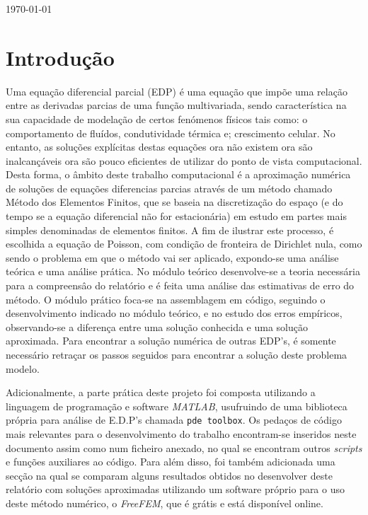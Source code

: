 \documentclass{article}
\theoremstyle{definition}
\theoremstyle{plain}
\numberwithin{equation}{section}
\newcommand{\tab}{\hspace{10mm}}
\begin{document}
\begin{titlepage}
{%
\vspace{1.5cm}
{\large \today}\\[1.5cm]}
\end{titlepage}
\newpage


\renewcommand{\thesection}{\arabic{section}}
\setcounter{secnumdepth}{3}
{
\tableofcontents
}
\pagebreak
\section{Introdução}

\tab Uma equação diferencial parcial (EDP) é uma equação que impõe uma relação entre as derivadas parcias de uma função multivariada, sendo característica na sua capacidade de modelação de certos fenómenos físicos tais como: o comportamento de fluídos, condutividade térmica e; crescimento celular. No entanto, as soluções explícitas destas equações ora não existem ora são inalcançáveis ora são pouco eficientes de utilizar do ponto de vista computacional. Desta forma, o âmbito deste trabalho computacional é a aproximação numérica de soluções de equações diferencias parcias através de um método chamado Método dos Elementos Finitos, que se baseia na discretização do espaço (e do tempo se a equação diferencial não for estacionária) em estudo em partes mais simples denominadas de elementos finitos. A fim de ilustrar este processo, é escolhida a equação de Poisson, com condição de fronteira de Dirichlet nula, como sendo o problema em que o método vai ser aplicado, expondo-se uma análise teórica e uma análise prática. No módulo teórico desenvolve-se a teoria necessária para a compreensâo do relatório e é feita uma análise das estimativas de erro do método. O módulo prático foca-se na assemblagem em código, seguindo o desenvolvimento indicado no módulo teórico, e no estudo dos erros empíricos, observando-se a diferença entre uma solução conhecida e uma solução aproximada. Para encontrar a solução numérica de outras EDP's, é somente necessário retraçar os passos seguidos para encontrar a solução deste problema modelo.

\tab Adicionalmente, a parte prática deste projeto foi composta utilizando a linguagem de programação e software \emph{MATLAB}, usufruindo de uma biblioteca própria para análise de E.D.P's chamada \verb+pde toolbox+. Os pedaços de código mais relevantes para o desenvolvimento do trabalho encontram-se inseridos neste documento assim como num ficheiro anexado, no qual se encontram outros \emph{scripts} e funções auxiliares ao código. Para além disso, foi também adicionada uma secção na qual se comparam alguns resultados obtidos no desenvolver deste relatório com soluções aproximadas utilizando um software próprio para o uso deste método numérico, o \emph{FreeFEM}, que é grátis e está disponível online.
\end{document}
